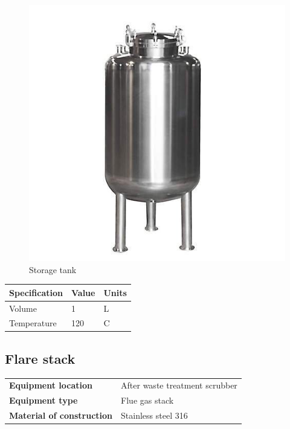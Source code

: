 \begin{figure}[H]
    \centering
    \includegraphics[width=\linewidth]{chapters/Z-support/figures/stainless-steel-storage-tank-500x500.jpg}
    \caption{Storage tank }%
\end{figure}

\begin{table}[H]
\centering
\begin{tabular}{@{}l|l|l@{}}
\toprule
\textbf{Specification}                    & \textbf{Value} & \textbf{Units} \\ \midrule
Volume                              & 1            & L            \\ \midrule
Temperature                     & 120     & C           \\ \bottomrule
\end{tabular}
\end{table}




\newpage
\subsection{Flare stack}

\begin{table}[H]
    \centering
    \begin{tabular}{@{}l|l@{}}
    \toprule
      \textbf{Equipment location}  & After waste treatment scrubber\\
       \textbf{Equipment type}  & Flue gas stack \\
       \textbf{Material of construction} & Stainless steel 316 \\
       \bottomrule
    \end{tabular}
\end{table}


